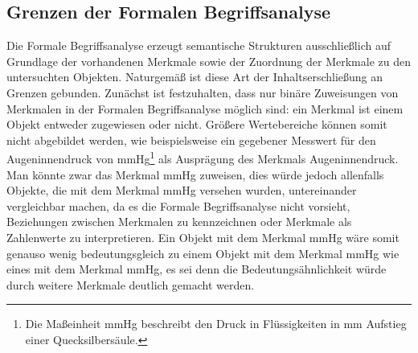\documentclass[pagesize,paper=A4,DIV=calc,fontsize=12pt,draft=false]{scrreprt}
\begin{document}
\label{fig:hasse}


\subsection{Grenzen der Formalen Begriffsanalyse}

Die Formale Begriffsanalyse erzeugt semantische Strukturen ausschließlich auf Grundlage der vorhandenen Merkmale sowie der Zuordnung der Merkmale zu den untersuchten Objekten. 
Naturgemäß ist diese Art der Inhaltserschließung an Grenzen gebunden. 
Zunächst ist festzuhalten, dass nur binäre Zuweisungen von Merkmalen in der Formalen Begriffsanalyse möglich sind: ein Merkmal ist einem Objekt entweder zugewiesen oder nicht. 
Größere Wertebereiche können somit nicht abgebildet werden, wie beispielsweise ein gegebener Messwert für den Augeninnendruck von \unit[17]{mmHg}\footnote{Die Maßeinheit \unit[]{mmHg} beschreibt den Druck in Flüssigkeiten in \unit[]{mm} Aufstieg einer Quecksilbersäule.} als Ausprägung des Merkmals Augeninnendruck. 
Man könnte zwar das Merkmal \unit[17]{mmHg} zuweisen, dies würde jedoch allenfalls Objekte, die mit dem Merkmal \unit[17]{mmHg} versehen wurden, untereinander vergleichbar machen, da es die Formale Begriffsanalyse nicht vorsieht, Beziehungen zwischen Merkmalen zu kennzeichnen oder Merkmale als Zahlenwerte zu interpretieren. 
Ein Objekt mit dem Merkmal \unit[16]{mmHg} wäre somit genauso wenig bedeutungsgleich zu einem Objekt mit dem Merkmal \unit[17]{mmHg} wie eines mit dem Merkmal \unit[6] {mmHg}, es sei denn die Bedeutungsähnlichkeit würde durch weitere Merkmale deutlich gemacht werden. 
\end{document}
